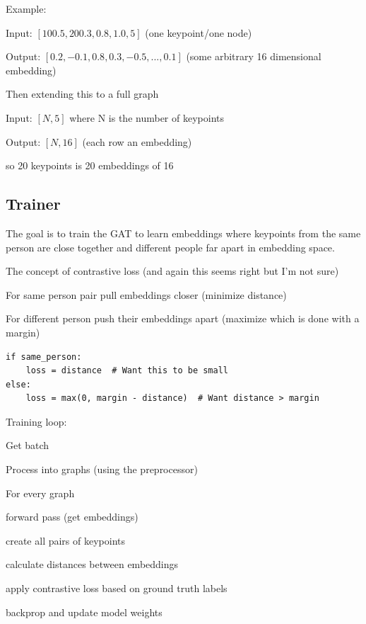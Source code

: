 Example:

Input: $[100.5, 200.3, 0.8, 1.0, 5]$ (one keypoint/one node)

Output: $[0.2, -0.1, 0.8, 0.3, -0.5, ..., 0.1]$ (some arbitrary 16 dimensional embedding)

Then extending this to a full graph 

Input: $[N, 5]$ where N is the number of keypoints 

Output: $[N,16]$ (each row an embedding)

so 20 keypoints is 20 embeddings of 16

\subsection{Trainer}

The goal is to train the GAT to learn embeddings where keypoints from the same person are close together and different people far
apart in embedding space.

The concept of contrastive loss (and again this seems right but I'm not sure)

For same person pair pull embeddings closer (minimize distance)

For different person push their embeddings apart (maximize which is done with a margin) 

\begin{lstlisting}[style=pythonstyle,title={Simple GAT Contrastive loss},label={code:pyg_simple_gat_contrastive_loss}]
if same_person:
    loss = distance  # Want this to be small
else:
    loss = max(0, margin - distance)  # Want distance > margin
\end{lstlisting}

Training loop:

\begin{compactitem}
	\item Get batch 
	\item Process into graphs (using the preprocessor) 
	\item For every graph 
		\begin{compactitem}
			\item forward pass (get embeddings) 
			\item create all pairs of keypoints 
			\item calculate distances between embeddings 
			\item apply contrastive loss based on ground truth labels 
		\end{compactitem}
	\item backprop and update model weights 
\end{compactitem}

